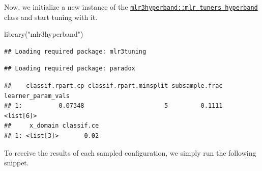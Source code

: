 \documentclass[
]{scrbook}
\newenvironment{Shaded}{\begin{snugshade}}{\end{snugshade}}
\newcommand{\AttributeTok}[1]{\textcolor[rgb]{0.77,0.63,0.00}{#1}}
\newcommand{\CommentTok}[1]{\textcolor[rgb]{0.56,0.35,0.01}{\textit{#1}}}
\newcommand{\ConstantTok}[1]{\textcolor[rgb]{0.00,0.00,0.00}{#1}}
\newcommand{\DecValTok}[1]{\textcolor[rgb]{0.00,0.00,0.81}{#1}}
\newcommand{\FunctionTok}[1]{\textcolor[rgb]{0.00,0.00,0.00}{#1}}
\newcommand{\NormalTok}[1]{#1}
\newcommand{\OtherTok}[1]{\textcolor[rgb]{0.56,0.35,0.01}{#1}}
\newcommand{\SpecialCharTok}[1]{\textcolor[rgb]{0.00,0.00,0.00}{#1}}
\newcommand{\StringTok}[1]{\textcolor[rgb]{0.31,0.60,0.02}{#1}}
\renewenvironment{Shaded} {\begin{snugshade}\small} {\end{snugshade}}
\begin{document}
Now, we initialize a new instance of the \href{https://www.rdocumentation.org/packages/mlr3hyperband/topics/mlr_tuners_hyperband}{\texttt{mlr3hyperband::mlr\_tuners\_hyperband}} class and start tuning with it.

\begin{Shaded}
\begin{Highlighting}[]
\FunctionTok{library}\NormalTok{(}\StringTok{"mlr3hyperband"}\NormalTok{)}
\end{Highlighting}
\end{Shaded}

\begin{verbatim}
## Loading required package: mlr3tuning
\end{verbatim}

\begin{verbatim}
## Loading required package: paradox
\end{verbatim}

\begin{Shaded}
\end{Shaded}

\begin{verbatim}
##    classif.rpart.cp classif.rpart.minsplit subsample.frac learner_param_vals
## 1:          0.07348                      5         0.1111          <list[6]>
##     x_domain classif.ce
## 1: <list[3]>       0.02
\end{verbatim}

To receive the results of each sampled configuration, we simply run the following snippet.

\begin{Shaded}
\end{Shaded}
\end{document}
